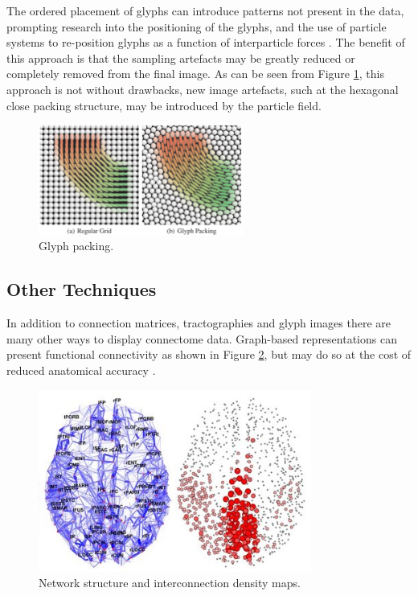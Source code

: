 \documentclass[MSc,paper=a4,pagesize=auto]{icldt}
\begin{document}
The ordered placement of glyphs can introduce patterns not present in the data, prompting research into the positioning of the glyphs, and the use of particle systems to re-position glyphs as a function of interparticle forces \cite{Kindlmann2006}. The benefit of this approach is that the sampling artefacts may be greatly reduced or completely removed from the final image. As can be seen from Figure \ref{fig:glyph_packing}, this approach is not without drawbacks, new image artefacts, such at the hexagonal close packing structure, may be introduced by the particle field. 

\begin{figure}[htbp!]
    \centering
    \includegraphics[width=0.6\textwidth]{resources/glyph_packing}
    \caption{Glyph packing. \cite{Kindlmann2006}}
    \label{fig:glyph_packing}
\end{figure}

\clearpage
\subsection{Other Techniques}
In addition to connection matrices, tractographies and glyph images there are many other ways to display connectome data. Graph-based representations can present functional connectivity \cite{Hagmann2008} as shown in Figure \ref{fig:connectome_graphs}, but may do so at the cost of reduced anatomical accuracy \cite{Margulies2013}. 

\begin{figure}[htbp!]
    \centering
    \includegraphics[width=0.8\textwidth]{resources/connectome_graphs}
    \caption{Network structure and interconnection density maps. \cite{Hagmann2005}}
    \label{fig:connectome_graphs}
\end{figure}
\end{document}
